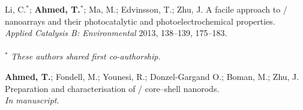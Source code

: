 \documentclass[draft,webedition,openright,titles,swedish,english]{LuaUUThesis}\usepackage[]{graphicx}\usepackage[]{xcolor}
\begin{document}
\begingroup
\let\cleardoublepage\relax
%

\begin{listofpapers}
   \item \label{P1} %
   Li, C.$^\ast$; \textbf{Ahmed, T.}$^\ast$; Ma, M.; Edvinsson, T.; Zhu, J. %
   A facile approach to / nanoarrays and their photocatalytic %
   and photo\-electro\-chemical properties.\\%
   \emph{Applied Catalysis B: Environmental} 2013, 138--139, 175--183.\\%
   \\%
   $^\ast$ \emph{These authors shared first co-authorship.}
      \bgroup
      \captionsetup{type=figureP1}
      \label{fig:01P-pxrd-diffractograms}
      \label{fig:01P-raman}
      \label{fig:01P-sem-nopulse}
      \label{fig:01P-sem-pulse}
      \label{fig:01P-tem-eds}
      \label{fig:01P-abs-tauc}
      \label{fig:01P-photoluminescence}
      \label{fig:01P-JV}
      \label{fig:01P-pc-abs}
      \egroup
   \item \label{P2} %
   \textbf{Ahmed, T.}; Fondell, M.; Younesi, R.; Donzel-Gargand O.; Boman, M.; Zhu, J. %
   Preparation and characterisation of / core--shell nanorods.\\%
   \emph{In manuscript}.
      \bgroup
      \captionsetup{type=figureP2}

\end{listofpapers}
\end{document}
